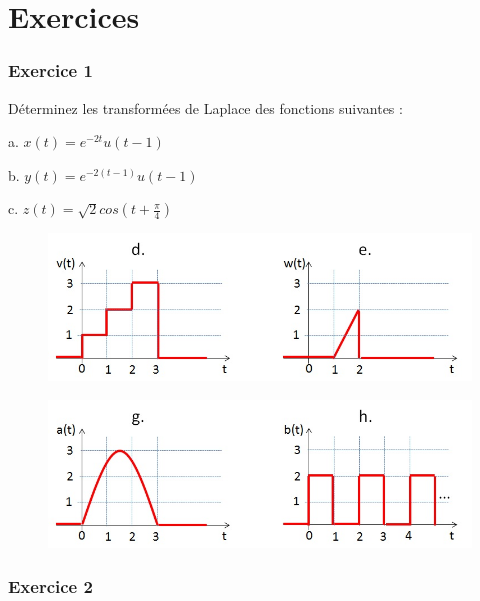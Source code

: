 	\vspace{1\baselineskip}
	

	
	\section{Exercices}
	
	\subsubsection{Exercice 1}
	
	Déterminez les transformées de Laplace des fonctions suivantes :
	
	a. $x(t)=e^{-2t}u(t-1)$
	
	b. $y(t)=e^{-2(t-1)}u(t-1)$
	
	c. $z(t) = \sqrt{2}cos(t+\frac{\pi}{4})$
	
	\begin{figure}[h!]
		\centering
		\includegraphics[scale=0.5]{images/Exo_2_1_a.jpg} 
	\end{figure} 
	
	\begin{figure}[h!]
		\centering
		\includegraphics[scale=0.5]{images/Exo_2_1_b.jpg} 
	\end{figure}
	
	
	
	\vspace{1\baselineskip}
	
	\subsubsection{Exercice 2}
	
